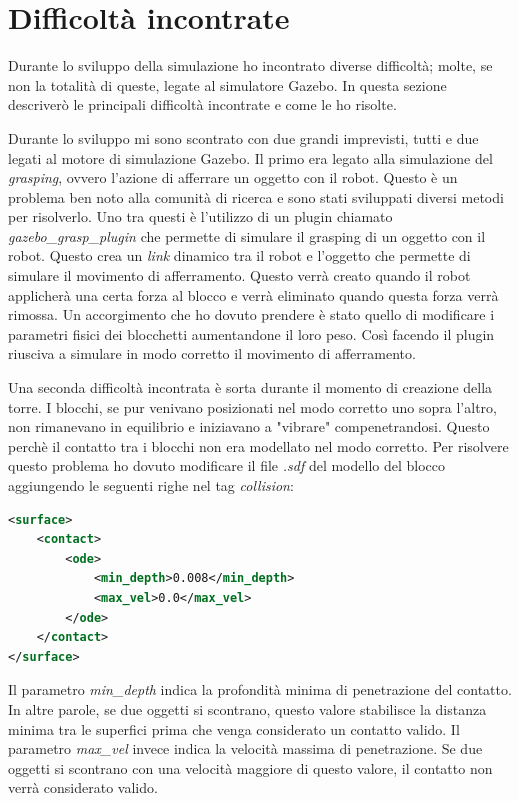 \section{Difficoltà incontrate}
\label{sec:difficoltaros}
Durante lo sviluppo della simulazione ho incontrato diverse difficoltà; molte, se non la totalità di queste, legate al simulatore Gazebo. In questa sezione descriverò le principali difficoltà incontrate e come le ho risolte.

Durante lo sviluppo mi sono scontrato con due grandi imprevisti, tutti e due legati al motore di simulazione Gazebo.
Il primo era legato alla simulazione del \textit{grasping}, ovvero l'azione di afferrare un oggetto con il robot. Questo è un problema ben noto alla comunità di ricerca e sono stati sviluppati diversi metodi per risolverlo.
Uno tra questi è l'utilizzo di un plugin chiamato \textit{gazebo\_grasp\_plugin} che permette di simulare il grasping di un oggetto con il robot. Questo crea un \textit{link} dinamico tra il robot e l'oggetto che permette di simulare il movimento di afferramento. Questo verrà creato quando il robot applicherà una certa forza al blocco e verrà eliminato quando questa forza verrà rimossa.
Un accorgimento che ho dovuto prendere è stato quello di modificare i parametri fisici dei blocchetti aumentandone il loro peso. Così facendo il plugin riusciva a simulare in modo corretto il movimento di afferramento.

Una seconda difficoltà incontrata è sorta durante il momento di creazione della torre. I blocchi, se pur venivano posizionati nel modo corretto uno sopra l'altro, non rimanevano in equilibrio e iniziavano a "vibrare" compenetrandosi. 
Questo perchè il contatto tra i blocchi non era modellato nel modo corretto. Per risolvere questo problema ho dovuto modificare il file \textit{.sdf} del modello del blocco aggiungendo le seguenti righe nel tag \textit{collision}:
\begin{lstlisting}[language=XML]
<surface>
    <contact>
        <ode>
            <min_depth>0.008</min_depth>
            <max_vel>0.0</max_vel>
        </ode>
    </contact>
</surface>
\end{lstlisting}
Il parametro \textit{min\_depth} indica la profondità minima di penetrazione del contatto. In altre parole, se due oggetti si scontrano, questo valore stabilisce la distanza minima tra le superfici prima che venga considerato un contatto valido. Il parametro \textit{max\_vel} invece indica la velocità massima di penetrazione. Se due oggetti si scontrano con una velocità maggiore di questo valore, il contatto non verrà considerato valido. 

